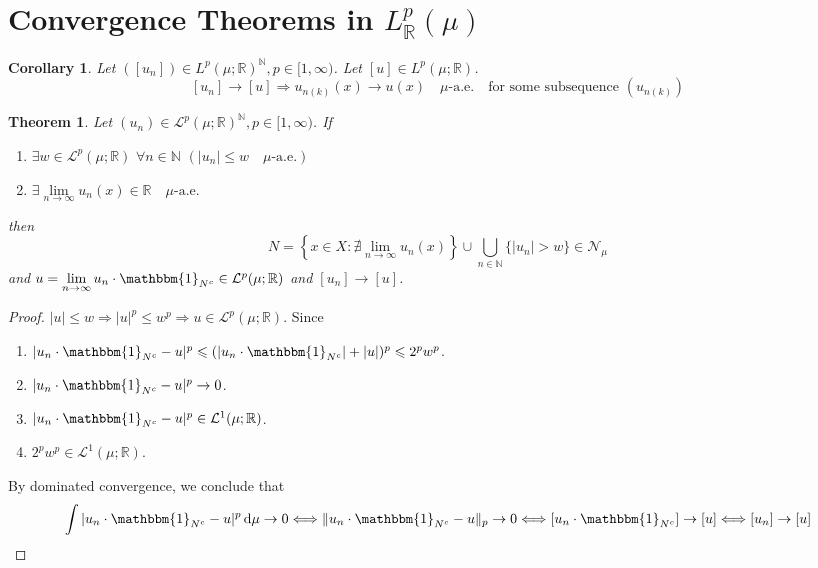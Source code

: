 \documentclass[11pt, a4paper, openany]{book}
\newtheorem{thm}{Theorem}\newtheorem{lem}{Lemma}\newtheorem{crl}{Corollary}
\theoremstyle{definition}
\begin{document}
\section{Convergence Theorems in \texorpdfstring{$L^p_\mathbb{R}(\mu)$}{Lp}}
    \begin{crl}\label{Cauchy sequence in p-norm has a.e. pointwise convergent subsequence}
        Let $([u_n])\in L^p(\mu;\mathbb{R})^\mathbb{N},p\in[1,\infty)$. Let $[u]\in L^p(\mu;\mathbb{R})$.
        \[[u_n]\to[u]\Longrightarrow u_{n(k)}(x)\to u(x)\quad \mu\text{-a.e.}\quad\text{for some subsequence }(u_{n(k)})\]
    \end{crl}
    \begin{thm}
        Let $(u_n)\in \mathcal{L}^p(\mu;\mathbb{R})^\mathbb{N}, p\in[1,\infty)$. If
        \begin{enumerate}
            \item $\exists w\in \mathcal{L}^p(\mu;\mathbb{R})\,\,\forall n\in\mathbb{N}\,\,(|u_n|\leqslant w\quad\mu\text{-a.e.})$
            \item $\exists\lim\limits_{n\to\infty}u_n(x)\in\mathbb{R}\quad\mu\text{-a.e.}$
        \end{enumerate}
        then
        \[N=\left\{x\in X:\nexists\lim_{n\to\infty}u_n(x)\right\}\cup\bigcup_{n\in\mathbb{N}}\{|u_n|>w\}\in\mathscr{N}_\mu\]
        and $u=\lim_{n\to\infty}\limits u_n\cdot \mathbbm{1}_{N^c}\in \mathcal{L}^p(\mu;\mathbb{R})$ and $[u_n]\to[u]$.
    \end{thm}
    \begin{proof}
        $|u|\leqslant w\Longrightarrow |u|^p\leqslant w^p\Longrightarrow u\in \mathcal{L}^p(\mu;\mathbb{R})$. Since
        \begin{enumerate}
            \item $|u_n\cdot \mathbbm{1}_{N^c}-u|^p\leqslant (|u_n\cdot \mathbbm{1}_{N^c}|+|u|)^p\leqslant 2^p w^p$.
            \item $|u_n\cdot \mathbbm{1}_{N^c}-u|^p\to 0$.
            \item $|u_n\cdot \mathbbm{1}_{N^c}-u|^p\in \mathcal{L}^1(\mu;\mathbb{R})$.
            \item $2^p w^p\in \mathcal{L}^1(\mu;\mathbb{R})$.
        \end{enumerate}
        By dominated convergence, we conclude that
        \[
            \int |u_n\cdot \mathbbm{1}_{N^c}-u|^p\odif \mu\to 0\Longleftrightarrow \|u_n\cdot \mathbbm{1}_{N^c}-u\|_p\to 0\Longleftrightarrow [u_n\cdot \mathbbm{1}_{N^c}]\to [u]\Longleftrightarrow [u_n]\to [u]
        \]
    \end{proof}
\end{document}
